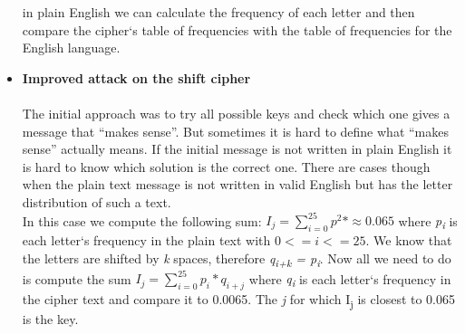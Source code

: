 \begin{itemize}
in plain English we can calculate the frequency of each letter and then compare the cipher`s table of frequencies with the table of frequencies for the English language.
    \item \textbf{Improved attack on the shift cipher}\\\\
The initial approach was to try all possible keys and check which one gives a message that
``makes sense''. But sometimes it is hard to define what ``makes sense'' actually means. If the
initial message is not written in plain English it is hard to know which solution is the correct one.
There are cases though when the plain text message is not written in valid English but has the
letter distribution of such a text.\\
In this case we compute the following sum: \begin{math}I_j = \sum_{i=0}^{25} p^2*\approx0.065\end{math} where \textit{p\textsubscript{i}} is each letter`s frequency in the plain text with \begin{math}0<=i<=25\end{math}. We know that the letters are shifted by \textit{k} spaces, therefore \textit{q\textsubscript{i+k} = p\textsubscript{i}}. Now all we need to do is compute the sum \begin{math}I_j = \sum_{i=0}^{25} p_i*q_{i+j}\end{math} where \textit{q\textsubscript{i}} is each letter`s frequency in the cipher text and compare it to 0.0065. The \textit{j} for which I\textsubscript{j} is closest to 0.065 is the key. 


\end{itemize}
